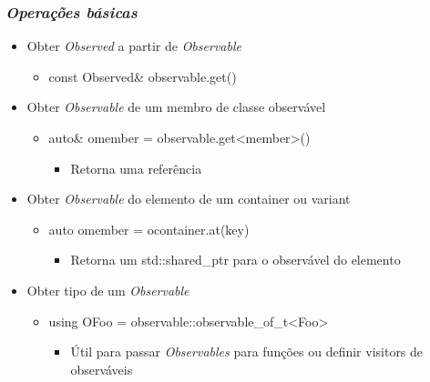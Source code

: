 \documentclass[t]{beamer}
\begin{document}
\begin{frame}[fragile]
  \frametitle{\textit{Operações básicas}}

  \begin{itemize}
  \item<1->{Obter \textit{Observed} a partir de \textit{Observable}}
    \begin{itemize}
    \item<1->{const Observed\& observable.get()}
    \end{itemize}
  \item<2->{Obter \textit{Observable} de um membro de classe observável}
    \begin{itemize}
    \item<2->{auto\& omember = observable.get<member>()}
      \begin{itemize}
      \item<3->{Retorna uma referência}
      \end{itemize}
    \end{itemize}
  \item<4->{Obter \textit{Observable} do elemento de um container ou variant}
    \begin{itemize}
    \item<4->{auto omember = ocontainer.at(key)}
      \begin{itemize}
      \item<5->{Retorna um std::shared\_ptr para o observável do elemento}
      \end{itemize}
    \end{itemize}
  \item<6->{Obter tipo de um \textit{Observable}}
    \begin{itemize}
    \item<6->{using OFoo = observable::observable\_of\_t<Foo>}
      \begin{itemize}
      \item<7->{Útil para passar \textit{Observables} para funções ou definir visitors de observáveis}
      \end{itemize}
    \end{itemize}
  \end{itemize}
\end{frame}
\end{document}
